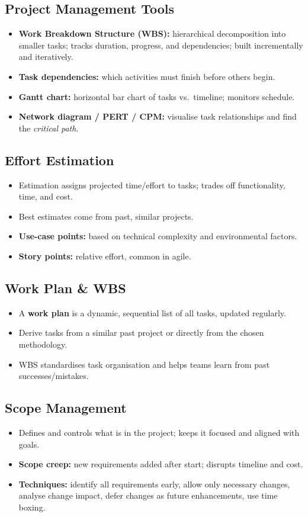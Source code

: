 \documentclass[hidelinks]{article}
\begin{document}
\subsection{Project Management Tools}
\begin{itemize}
  \item \textbf{Work Breakdown Structure (WBS):} hierarchical decomposition into smaller tasks;
        tracks duration, progress, and dependencies; built incrementally and iteratively.
  \item \textbf{Task dependencies:} which activities must finish before others begin.
  \item \textbf{Gantt chart:} horizontal bar chart of tasks vs.\ timeline; monitors schedule.
  \item \textbf{Network diagram / PERT / CPM:} visualise task relationships and find the
        \emph{critical path}.
\end{itemize}

\subsection{Effort Estimation}
\begin{itemize}
  \item Estimation assigns projected time/effort to tasks; trades off functionality, time, and cost.
  \item Best estimates come from past, similar projects.
  \item \textbf{Use-case points:} based on technical complexity and environmental factors.
  \item \textbf{Story points:} relative effort, common in agile.
\end{itemize}

\subsection{Work Plan \& WBS}
\begin{itemize}
  \item A \textbf{work plan} is a dynamic, sequential list of all tasks, updated regularly.
  \item Derive tasks from a similar past project or directly from the chosen methodology.
  \item WBS standardises task organisation and helps teams learn from past successes/mistakes.
\end{itemize}

\subsection{Scope Management}
\begin{itemize}
  \item Defines and controls what is in the project; keeps it focused and aligned with goals.
  \item \textbf{Scope creep:} new requirements added after start; disrupts timeline and cost.
  \item \textbf{Techniques:} identify all requirements early, allow only necessary changes,
        analyse change impact, defer changes as future enhancements, use time boxing.
\end{itemize}
\end{document}
